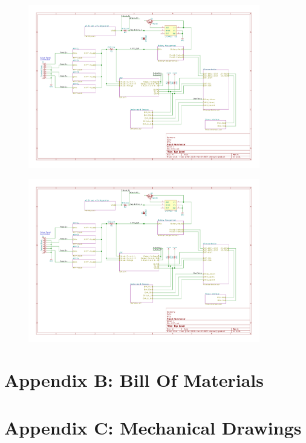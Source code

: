 \documentclass{article}
\begin{document}
{\begin{figure}[H]
	\centering
	\includegraphics[page=11,width=0.9\textwidth]{RFCxSchematics.pdf}
	\caption{}
	\label{fig:schemp11}
\end{figure}

\begin{figure}[H]
	\centering
	\includegraphics[page=1,width=0.9\textwidth]{RFCxSchematics.pdf}
	\caption{}
	\label{fig:schemp1}
\end{figure}

\newpage
\section*{Appendix B: Bill Of Materials}

\newpage
\section*{Appendix C: Mechanical Drawings}

}
\end{document}
